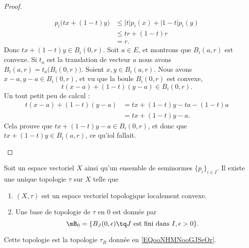 \begin{proof}
\begin{subproof}
\begin{subequations}
\begin{align}
				p_i\big( tx+(1-t)y \big) & \leq | t |p_i(x)+| 1-t |p_i(y) \\
				                         & \leq tr+(1-t)r                 \\
				                         & =r.
			\end{align}
		\end{subequations}
		Donc \( tx+(1-t)y\in B_i(0,r)\).
		Soit \( a\in E\), et montrons que \( B_i(a,r)\) est convexe. Si \( t_a\) est la translation de vecteur \( a\) nous avons \( B_i(a,r)=t_a\big( B_i(0,r) \big)\). Soient \( x,y\in B_i(a,r)\). Nous avons \( x-a,y-a\in B_i(0,r)\), et vu que la boule \( B_i(0,r)\) est convexe,
		\begin{equation}
			t(x-a)+(1-t)(y-a)\in B_i(0,r).
		\end{equation}
		Un tout petit peu de calcul :
		\begin{subequations}
			\begin{align}
				t(x-a)+(1-t)(y-a) & =tx+(1-t)y-ta-(1-t)a \\
				                  & =tx+(1-t)y-a.
			\end{align}
		\end{subequations}
		Cela prouve que \( tx+(1-t)y-a\in B_i(0,r)\), et donc que \( tx+(1-t)y\in B_i(a,r)\), ce qu'iol fallait.
	\end{subproof}
\end{proof}

\begin{proposition}		\label{PROPooNAFAooShzixo}
	Soit un espace vectoriel \( X\) ainsi qu'un ensemble de seminormes \( \{ p_i \}_{i\in I}\). Il existe une unique topologie \( \tau\) sur \( X\) telle que
	\begin{enumerate}
		\item
		      \( (X,\tau)\) est un espace vectoriel topologique localement convexe.
		\item
		      Une base de topologie de \( \tau\) en \( 0\) est donnée par
		      \begin{equation}
			      \mB_0=\{   B_J(0,\epsilon)\tq \text{\( J\) est fini dans \( I\)}, \epsilon>0   \}.
		      \end{equation}
	\end{enumerate}
	Cette topologie est la topologie \( \tau_B\) donnée en \eqref{EQooNHMNooGJSeOr}.
\end{proposition}


